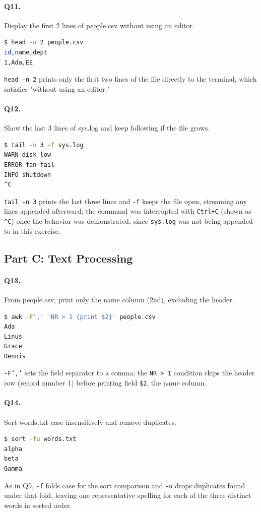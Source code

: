 \paragraph{Q11.} Display the first 2 lines of people.csv without using an editor.
\begin{lstlisting}[language=bash,caption={Q11 evidence: \texttt{head -n 2 people.csv}},label={Listing:Q11}]
$ head -n 2 people.csv
id,name,dept
1,Ada,EE
\end{lstlisting}
\texttt{head -n 2} prints only the first two lines of the file directly to the terminal, which satisfies "without using an editor."

\paragraph{Q12.} Show the last 3 lines of sys.log and keep following if the file grows.
\begin{lstlisting}[language=bash,caption={Q12 evidence: \texttt{tail -n 3 -f sys.log}},label={Listing:Q12}]
$ tail -n 3 -f sys.log
WARN disk low
ERROR fan fail
INFO shutdown
^C
\end{lstlisting}
\texttt{tail -n 3} prints the last three lines and \texttt{-f} keeps the file open, streaming any lines appended afterward; the command was interrupted with \texttt{Ctrl+C} (shown as \texttt{\^{}C}) once the behavior was demonstrated, since \texttt{sys.log} was not being appended to in this exercise.

\subsection{Part C: Text Processing}
\paragraph{Q13.} From people.csv, print only the name column (2nd), excluding the header.
\begin{lstlisting}[language=bash,caption={Q13 evidence: \texttt{awk -F',' 'NR > 1 \{print \$2\}' people.csv}},label={Listing:Q13}]
$ awk -F',' 'NR > 1 {print $2}' people.csv
Ada
Linus
Grace
Dennis
\end{lstlisting}
\texttt{-F','} sets the field separator to a comma; the \texttt{NR > 1} condition skips the header row (record number 1) before printing field \texttt{\$2}, the name column.

\paragraph{Q14.} Sort words.txt case-insensitively and remove duplicates.
\begin{lstlisting}[language=bash,caption={Q14 evidence: \texttt{sort -fu words.txt}},label={Listing:Q14}]
$ sort -fu words.txt
alpha
beta
Gamma
\end{lstlisting}
As in Q9, \texttt{-f} folds case for the sort comparison and \texttt{-u} drops duplicates found under that fold, leaving one representative spelling for each of the three distinct words in sorted order.

